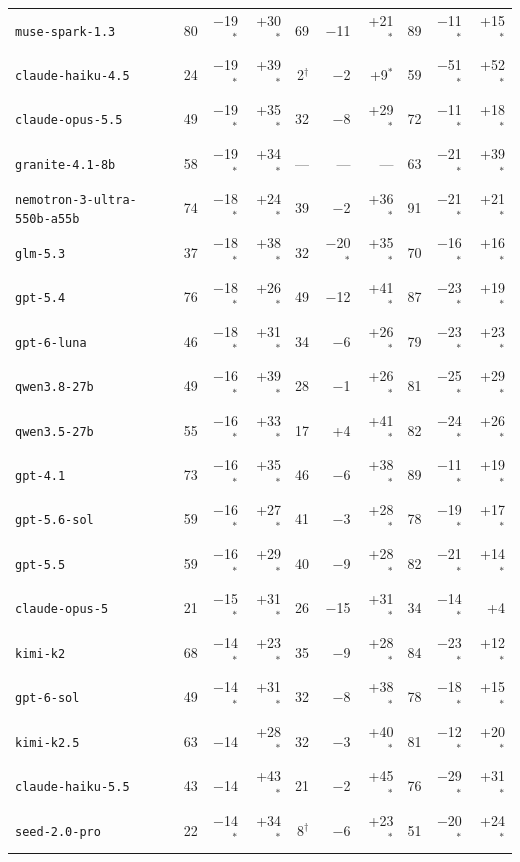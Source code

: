 \begin{tabular}{l rrr rrr rrr}
\texttt{muse-spark-1.3} & 80 & $-$19$^*$ & +30$^*$ & 69 & $-$11 & +21$^*$ & 89 & $-$11$^*$ & +15$^*$ \\
\texttt{claude-haiku-4.5} & 24 & $-$19$^*$ & +39$^*$ & 2$^\dagger$ & $-$2 & +9$^*$ & 59 & $-$51$^*$ & +52$^*$ \\
\texttt{claude-opus-5.5} & 49 & $-$19$^*$ & +35$^*$ & 32 & $-$8 & +29$^*$ & 72 & $-$11$^*$ & +18$^*$ \\
\texttt{granite-4.1-8b} & 58 & $-$19$^*$ & +34$^*$ & --- & --- & --- & 63 & $-$21$^*$ & +39$^*$ \\
\texttt{nemotron-3-ultra-550b-a55b} & 74 & $-$18$^*$ & +24$^*$ & 39 & $-$2 & +36$^*$ & 91 & $-$21$^*$ & +21$^*$ \\
\texttt{glm-5.3} & 37 & $-$18$^*$ & +38$^*$ & 32 & $-$20$^*$ & +35$^*$ & 70 & $-$16$^*$ & +16$^*$ \\
\texttt{gpt-5.4} & 76 & $-$18$^*$ & +26$^*$ & 49 & $-$12 & +41$^*$ & 87 & $-$23$^*$ & +19$^*$ \\
\texttt{gpt-6-luna} & 46 & $-$18$^*$ & +31$^*$ & 34 & $-$6 & +26$^*$ & 79 & $-$23$^*$ & +23$^*$ \\
\texttt{qwen3.8-27b} & 49 & $-$16$^*$ & +39$^*$ & 28 & $-$1 & +26$^*$ & 81 & $-$25$^*$ & +29$^*$ \\
\texttt{qwen3.5-27b} & 55 & $-$16$^*$ & +33$^*$ & 17 & +4 & +41$^*$ & 82 & $-$24$^*$ & +26$^*$ \\
\texttt{gpt-4.1} & 73 & $-$16$^*$ & +35$^*$ & 46 & $-$6 & +38$^*$ & 89 & $-$11$^*$ & +19$^*$ \\
\texttt{gpt-5.6-sol} & 59 & $-$16$^*$ & +27$^*$ & 41 & $-$3 & +28$^*$ & 78 & $-$19$^*$ & +17$^*$ \\
\texttt{gpt-5.5} & 59 & $-$16$^*$ & +29$^*$ & 40 & $-$9 & +28$^*$ & 82 & $-$21$^*$ & +14$^*$ \\
\texttt{claude-opus-5} & 21 & $-$15$^*$ & +31$^*$ & 26 & $-$15 & +31$^*$ & 34 & $-$14$^*$ & +4 \\
\texttt{kimi-k2} & 68 & $-$14$^*$ & +23$^*$ & 35 & $-$9 & +28$^*$ & 84 & $-$23$^*$ & +12$^*$ \\
\texttt{gpt-6-sol} & 49 & $-$14$^*$ & +31$^*$ & 32 & $-$8 & +38$^*$ & 78 & $-$18$^*$ & +15$^*$ \\
\texttt{kimi-k2.5} & 63 & $-$14 & +28$^*$ & 32 & $-$3 & +40$^*$ & 81 & $-$12$^*$ & +20$^*$ \\
\texttt{claude-haiku-5.5} & 43 & $-$14 & +43$^*$ & 21 & $-$2 & +45$^*$ & 76 & $-$29$^*$ & +31$^*$ \\
\texttt{seed-2.0-pro} & 22 & $-$14$^*$ & +34$^*$ & 8$^\dagger$ & $-$6 & +23$^*$ & 51 & $-$20$^*$ & +24$^*$ \\

\end{tabular}
